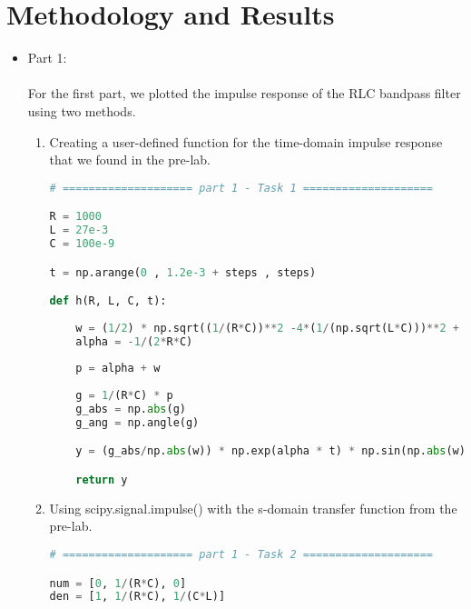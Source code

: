 \documentclass[12pt,a4paper]{article}
\begin{document}
\section{Methodology and Results}\label{sec:meth}
\begin{itemize}
    \item
    Part 1:\\
    
    \\For the first part, we plotted the impulse response of the RLC bandpass filter using two methods.\\

\begin{enumerate}
    \item 
    Creating a user-defined function for the time-domain impulse response that we found in the pre-lab.
    
\begin{lstlisting}[language=Python, caption={User-defined impulse response function}, label={lst:code}, mathescape=true, breaklines=true]
# ==================== part 1 - Task 1 ====================

R = 1000
L = 27e-3
C = 100e-9

t = np.arange(0 , 1.2e-3 + steps , steps)

def h(R, L, C, t):
    
    w = (1/2) * np.sqrt((1/(R*C))**2 -4*(1/(np.sqrt(L*C)))**2 + 0j) * u(t)
    alpha = -1/(2*R*C)
    
    p = alpha + w
    
    g = 1/(R*C) * p
    g_abs = np.abs(g)
    g_ang = np.angle(g)

    y = (g_abs/np.abs(w)) * np.exp(alpha * t) * np.sin(np.abs(w) * t + g_ang)

    return y
\end{lstlisting}

\clearpage

    \item
    Using scipy.signal.impulse() with the s-domain transfer function from the pre-lab.

\begin{lstlisting}[language=Python, caption={impulse response using scipy.signal.impulse()}, label={lst:code}, mathescape=true, breaklines=true]
# ==================== part 1 - Task 2 ====================

num = [0, 1/(R*C), 0]
den = [1, 1/(R*C), 1/(C*L)]


\end{lstlisting}
\end{enumerate}
\end{itemize}
\end{document}
